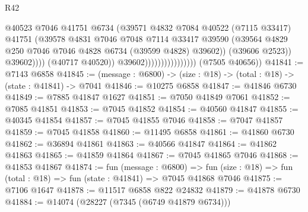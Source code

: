 \begin{lexlean}{R42}
\begin{coremodule}
{                                                @40523
                                                @7046
                                                @41751
                                                @6734
                                                (@39571
                                                  @4832
                                                  @7084
                                                  @40522
                                                  (@7115 @33417)
                                                  @41751
                                                  (@39578
                                                    @4831
                                                    @7046
                                                    @7048
                                                    @7114
                                                    @33417
                                                    @39590
                                                    (@39564
                                                      @4829
                                                      @250
                                                      @7046
                                                      @7046
                                                      @4828
                                                      @6734
                                                      (@39599 @4828)
                                                      @39602))
                                                  (@39606 @2523))
                                                @39602))))
                                        (@40717 @40520))
                                      @39602))))))))))))))))
      (@7505 @40656))
@41841 := @7143 @6858
@41845 := (message : @6800) -> (size : @18) -> (total : @18) -> (state : @41841) -> @7041
@41846 := @10275 @6858
@41847 := @41846 @6730
@41849 := @7885 @41847 @1627
@41851 := @7050 @41849 @7061
@41852 := @7085 @41851
@41853 := @7045 @41852
@41854 := @40560 @41847
@41855 := @40345 @41854
@41857 := @7045 @41855 @7046
@41858 := @7047 @41857
@41859 := @7045 @41858
@41860 := @11495 @6858
@41861 := @41860 @6730
@41862 := @36894 @41861
@41863 := @40566 @41847
@41864 := @41862 @41863
@41865 := @41859 @41864
@41867 := @7045 @41865 @7046
@41868 := @41853 @41867
@41874 := fun (message : @6800) =>
  fun (size : @18) => fun (total : @18) => fun (state : @41841) => @7045 @41868 @7046
@41875 := @7106 @1647
@41878 := @11517 @6858 @822 @24832
@41879 := @41878 @6730
@41884 := @14074 (@28227 (@7345 (@6749 @41879 @6734)))
}
\end{coremodule}
\end{lexlean}
